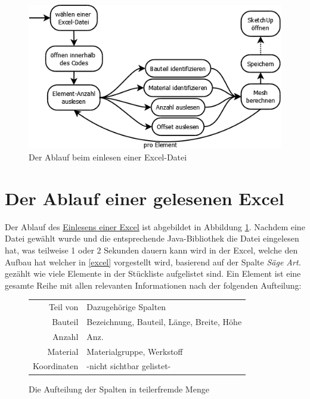 \documentclass{book}
\begin{document}
			\begin{figure}
				\includegraphics[scale=0.4]{diagramms/excelRead-ablauf.png}
				\caption{Der Ablauf beim einlesen einer Excel-Datei}
				\label{fig:excelRead flow}
			\end{figure}
			
			
		\section{Der Ablauf einer gelesenen Excel}
			Der Ablauf des \hyperref[excelread]{Einlesens einer Excel} ist abgebildet in Abbildung \ref{fig:excelRead flow}. Nachdem eine Datei gewählt wurde und die entsprechende Java-Bibliothek die Datei eingelesen hat, was teilweise 1 oder 2 Sekunden dauern kann wird in der Excel, welche den Aufbau hat welcher in \ref{excel} vorgestellt wird, basierend auf der Spalte \textit{Säge Art.} gezählt wie viele Elemente in der Stückliste aufgelistet sind. Ein Element ist eine gesamte Reihe mit allen relevanten Informationen nach der folgenden Aufteilung:\\
			\begin{figure}
				\centering
				\begin{tabular}{r | l}
					Teil von & Dazugehörige Spalten \\
					Bauteil & Bezeichnung, Bauteil, Länge, Breite, Höhe \\
					Anzahl & Anz. \\
					Material & Materialgruppe, Werkstoff \\
					Koordinaten & -nicht sichtbar gelistet-
				\end{tabular}
				\caption{Die Aufteilung der Spalten in teilerfremde Menge}
				\label{table:sets}
			\end{figure}
\end{document}
